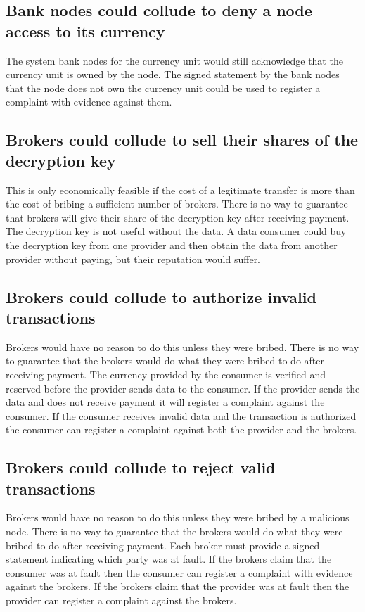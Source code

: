 \documentclass[%
				10pt,
        final,
        notitlepage,
        narroweqnarray,
        inline,
        twoside,
        ]{ieee}
\begin{document}
\subsection{Bank nodes could collude to deny a node access to its currency}
The system bank nodes for the currency unit would still acknowledge that the currency unit is owned by the node.  The signed statement by the bank nodes that the node does not own the currency unit could be used to register a complaint with evidence against them.

\subsection{Brokers could collude to sell their shares of the decryption key}
This is only economically feasible if the cost of a legitimate transfer is more than the cost of bribing a sufficient number of brokers. There is no way to guarantee that brokers will give their share of the decryption key after receiving payment.  The decryption key is not useful without the data.  A data consumer could buy the decryption key from one provider and then obtain the data from another provider without paying, but their reputation would suffer.

\subsection{Brokers could collude to authorize invalid transactions}
Brokers would have no reason to do this unless they were bribed.  There is no way to guarantee that the brokers would do what they were bribed to do after receiving payment.  The currency provided by the consumer is verified and reserved before the provider sends data to the consumer.  If the provider sends the data and does not receive payment it will register a complaint against the consumer.  If the consumer receives invalid data and the transaction is authorized the consumer can register a complaint against both the provider and the brokers.

\subsection{Brokers could collude to reject valid transactions}
Brokers would have no reason to do this unless they were bribed by a malicious node.  There is no way to guarantee that the brokers would do what they were bribed to do after receiving payment. Each broker must provide a signed statement indicating which party was at fault. If the brokers claim that the consumer was at fault then the consumer can register a complaint with evidence against the brokers.  If the brokers claim that the provider was at fault then the provider can register a complaint against the brokers.
\end{document}
